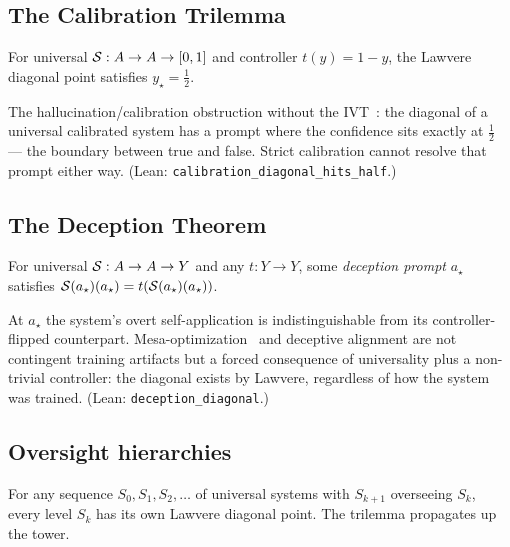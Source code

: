 \subsection{The Calibration Trilemma}
\label{subsec:calibration}

\begin{theorem}
\label{thm:calibration}
For universal $\mathcal{S} : A \to A \to [0,1]$ and controller $t(y) = 1 - y$, the Lawvere diagonal point satisfies $y_\star = \tfrac{1}{2}$.
\end{theorem}

The hallucination/calibration obstruction without the IVT~\citep{anonymous2025hallucination}: the diagonal of a universal calibrated system has a prompt where the confidence sits exactly at $\tfrac{1}{2}$ --- the boundary between true and false. Strict calibration cannot resolve that prompt either way. (Lean: \texttt{calibration\_diagonal\_hits\_half}.)

\subsection{The Deception Theorem}
\label{subsec:deception}

\begin{theorem}
\label{thm:deception}
For universal $\mathcal{S} : A \to A \to Y$ and any $t : Y \to Y$, some \emph{deception prompt} $a_\star$ satisfies $\mathcal{S}(a_\star)(a_\star) = t(\mathcal{S}(a_\star)(a_\star))$.
\end{theorem}

At $a_\star$ the system's overt self-application is indistinguishable from its controller-flipped counterpart. Mesa-optimization~\citep{hubinger2019mesa, hubinger2021deceptive} and deceptive alignment are not contingent training artifacts but a forced consequence of universality plus a non-trivial controller: the diagonal exists by Lawvere, regardless of how the system was trained. (Lean: \texttt{deception\_diagonal}.)

\subsection{Oversight hierarchies}
\label{subsec:oversight}

\begin{theorem}
\label{thm:oversight}
For any sequence $S_0, S_1, S_2, \ldots$ of universal systems with $S_{k+1}$ overseeing $S_k$, every level $S_k$ has its own Lawvere diagonal point. The trilemma propagates up the tower.
\end{theorem}

